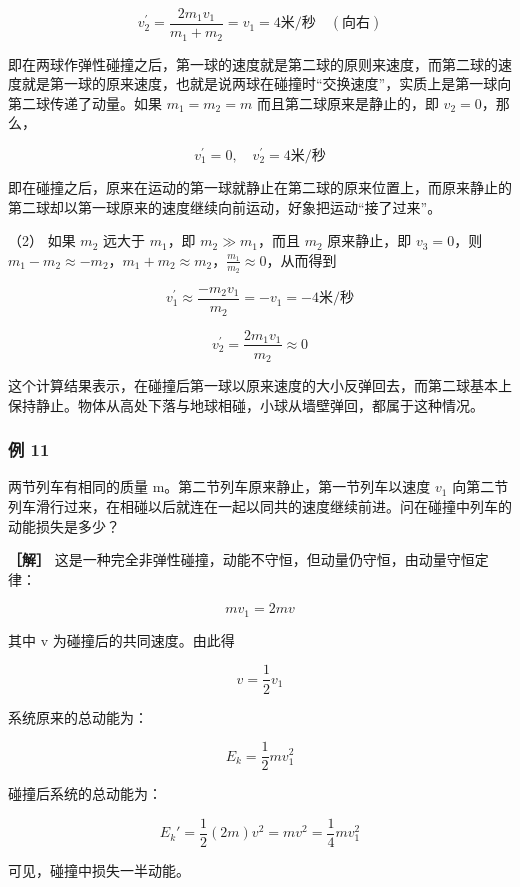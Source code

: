 \[
v _ {2} ^ {\prime} = \frac {2 m _ {1} v _ {1}}{m _ {1} + m _ {2}} = v _ {1} = 4 \text{米/秒} \quad (\text{向右})
\]

即在两球作弹性碰撞之后，第一球的速度就是第二球的原则来速度，而第二球的速度就是第一球的原来速度，也就是说两球在碰撞时``交换速度''，实质上是第一球向第二球传递了动量。如果
\(m_{1} = m_{2} = m\) 而且第二球原来是静止的，即 \(v_{2} = 0\)，那么，

\[
v _ {1} ^ {\prime} = 0, \quad v _ {2} ^ {\prime} = 4 \text{米/秒}
\]

即在碰撞之后，原来在运动的第一球就静止在第二球的原来位置上，而原来静止的第二球却以第一球原来的速度继续向前运动，好象把运动``接了过来''。

（2） 如果 \(m_{2}\) 远大于 \(m_{1}\)，即 \(m_{2} \gg m_{1}\)，而且
\(m_{2}\) 原来静止，即 \(v_{3} = 0\)，则
\(m_{1} - m_{2} \approx -m_{2}\)，\(m_{1} + m_{2} \approx m_{2}\)，\(\frac{m_{1}}{m_{2}} \approx 0\)，从而得到

\[
v _ {1} ^ {\prime} \approx \frac {- m _ {2} v _ {1}}{m _ {2}} = - v _ {1} = - 4 \text{米/秒}
\]

\[
v _ {2} ^ {\prime} = \frac {2 m _ {1} v _ {1}}{m _ {2}} \approx 0
\]

这个计算结果表示，在碰撞后第一球以原来速度的大小反弹回去，而第二球基本上保持静止。物体从高处下落与地球相碰，小球从墙壁弹回，都属于这种情况。

\subsubsection{例 11}\label{ux4f8b-11-4}

两节列车有相同的质量 m。第二节列车原来静止，第一节列车以速度 \(v_{1}\)
向第二节列车滑行过来，在相碰以后就连在一起以同共的速度继续前进。问在碰撞中列车的动能损失是多少？

\textbf{［解］}
这是一种完全非弹性碰撞，动能不守恒，但动量仍守恒，由动量守恒定律：

\[
m v _ {1} = 2 m v
\]

其中 v 为碰撞后的共同速度。由此得

\[
v = \frac {1}{2} v _ {1}
\]

系统原来的总动能为：

\[
E _ {k} = \frac {1}{2} m v _ {1} ^ {2}
\]

碰撞后系统的总动能为：

\[
E_{k}'=\frac{1}{2}(2m)v^{2}=mv^{2} =\frac{1}{4}mv_{1}^{2}
\]

可见，碰撞中损失一半动能。

